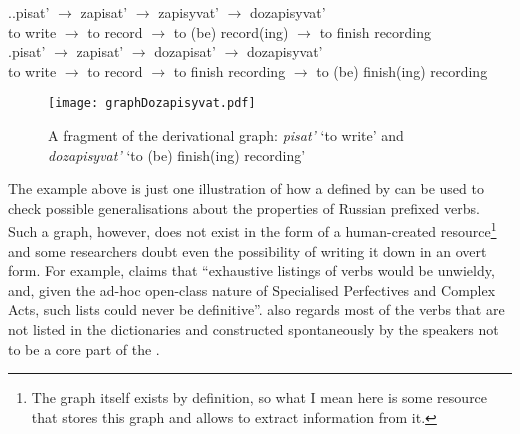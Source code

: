 \ex.\label{deriv:dozapisyvat}\ag.\label{deriv:dozapisyvat1}pisat'\textsuperscript{\IPF} $\rightarrow$ zapisat'\textsuperscript{\PF} $\rightarrow$ zapisyvat'\textsuperscript{\IPF} $\rightarrow$ dozapisyvat'\textsuperscript{\PF}\\
{to write} $\rightarrow$ {to record} $\rightarrow$ {to (be) record(ing)} $\rightarrow$ {to finish recording}\\
\bg.\label{deriv:dozapisyvat2}pisat'\textsuperscript{\IPF} $\rightarrow$ zapisat'\textsuperscript{\PF} $\rightarrow$ dozapisat'\textsuperscript{\PF} $\rightarrow$ dozapisyvat'\textsuperscript{\IPF}\\
{to write} $\rightarrow$ {to record} $\rightarrow$ {to finish recording} $\rightarrow$ {to (be) finish(ing) recording}\\				

\begin{figure}
\begin{center}
\texttt{[image: graphDozapisyvat.pdf]}
\caption{A fragment of the derivational graph: \textit{pisat'} `to write' and \textit{dozapisyvat'} `to (be) finish(ing) recording'\label{tree:dozapisyvat}}
\end{center}
\end{figure}			

The example above is just one illustration of how a  defined by  can be used to check possible generalisations about the properties of Russian prefixed verbs. Such a graph, however, does not exist in the form of a human-created resource\footnote{The graph itself exists by definition, so what I mean here is some resource that stores this graph and allows to extract information from it.} and some researchers doubt even the possibility of writing it down in an overt form. For example, \citet[625]{Janda:07a} claims that ``exhaustive listings of verbs would be unwieldy, and, given the ad-hoc open-class nature of Specialised Perfectives and Complex Acts, such lists could never be definitive''. \citet[626]{Janda:07a} also regards most of the verbs that are not listed in the dictionaries and constructed spontaneously by the speakers not to be a core part of the .

